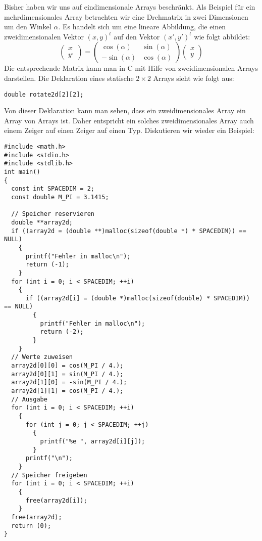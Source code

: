 Bisher haben wir uns auf eindimensionale Arrays beschränkt.
Als Beispiel für ein mehrdimensionales Array betrachten wir eine Drehmatrix in zwei Dimensionen um den Winkel $\alpha$. 
Es handelt sich um eine lineare Abbildung, die einen zweidimensionalen Vektor $(x,y)^t$ auf den Vektor $(x',y')^t$ wie folgt abbildet:
\begin{equation}
  \left(\begin{array}{c}x^{,}\\y^{,}\end{array}\right)=
  \left(\begin{array}{cc} \cos\left(\alpha\right) & \sin\left(\alpha\right) \\
    -\sin\left(\alpha\right) & \cos\left(\alpha\right) 
  \end{array}\right)
  \left(\begin{array}{c}x\\y\end{array}\right)
\end{equation}
Die entsprechende Matrix kann man in C mit Hilfe von zweidimensionalen Arrays darstellen.
Die Deklaration eines statische $2\times2$ Arrays sieht wie folgt aus:
\begin{lstlisting}
double rotate2d[2][2];
\end{lstlisting}
Von dieser Deklaration kann man sehen, dass ein zweidimensionales Array ein Array von Arrays ist.
Daher entspricht ein solches zweidimensionales Array auch einem Zeiger auf einen Zeiger auf einen Typ.
Diskutieren wir wieder ein Beispiel:
\begin{lstlisting}
#include <math.h>
#include <stdio.h>
#include <stdlib.h>
int main()
{
  const int SPACEDIM = 2;
  const double M_PI = 3.1415;

  // Speicher reservieren
  double **array2d;
  if ((array2d = (double **)malloc(sizeof(double *) * SPACEDIM)) == NULL)
    {
      printf("Fehler in malloc\n");
      return (-1);
    }
  for (int i = 0; i < SPACEDIM; ++i)
    {
      if ((array2d[i] = (double *)malloc(sizeof(double) * SPACEDIM)) == NULL)
        {
          printf("Fehler in malloc\n");
          return (-2);
        }
    }
  // Werte zuweisen
  array2d[0][0] = cos(M_PI / 4.);
  array2d[0][1] = sin(M_PI / 4.);
  array2d[1][0] = -sin(M_PI / 4.);
  array2d[1][1] = cos(M_PI / 4.);
  // Ausgabe
  for (int i = 0; i < SPACEDIM; ++i)
    {
      for (int j = 0; j < SPACEDIM; ++j)
        {
          printf("%e ", array2d[i][j]);
        }
      printf("\n");
    }
  // Speicher freigeben
  for (int i = 0; i < SPACEDIM; ++i)
    {
      free(array2d[i]);
    }
  free(array2d);
  return (0);
}
\end{lstlisting}
